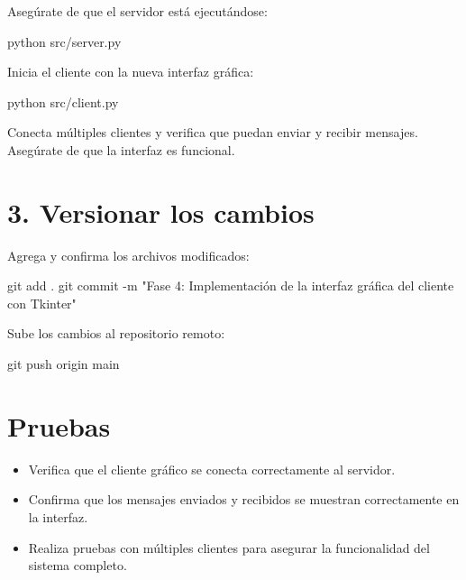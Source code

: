 \documentclass[
  a4paper,
  DIV=11,
  numbers=noendperiod,
  onepage,
  openany]{scrreprt}
\newenvironment{Shaded}{\begin{snugshade}}{\end{snugshade}}
\newcommand{\AttributeTok}[1]{\textcolor[rgb]{0.40,0.45,0.13}{#1}}
\newcommand{\ExtensionTok}[1]{\textcolor[rgb]{0.00,0.23,0.31}{#1}}
\newcommand{\FunctionTok}[1]{\textcolor[rgb]{0.28,0.35,0.67}{#1}}
\newcommand{\NormalTok}[1]{\textcolor[rgb]{0.00,0.23,0.31}{#1}}
\newcommand{\StringTok}[1]{\textcolor[rgb]{0.13,0.47,0.30}{#1}}
\providecommand{\tightlist}{%
  \setlength{\itemsep}{0pt}\setlength{\parskip}{0pt}}\usepackage{longtable,booktabs,array}
\begin{document}
Asegúrate de que el servidor está ejecutándose:

\begin{Shaded}
\begin{Highlighting}[]
\ExtensionTok{python}\NormalTok{ src/server.py}
\end{Highlighting}
\end{Shaded}

Inicia el cliente con la nueva interfaz gráfica:

\begin{Shaded}
\begin{Highlighting}[]
\ExtensionTok{python}\NormalTok{ src/client.py}
\end{Highlighting}
\end{Shaded}

Conecta múltiples clientes y verifica que puedan enviar y recibir
mensajes. Asegúrate de que la interfaz es funcional.

\section{3. Versionar los cambios}\label{versionar-los-cambios-2}

Agrega y confirma los archivos modificados:

\begin{Shaded}
\begin{Highlighting}[]
\FunctionTok{git}\NormalTok{ add .}
\FunctionTok{git}\NormalTok{ commit }\AttributeTok{{-}m} \StringTok{"Fase 4: Implementación de la interfaz gráfica del cliente con Tkinter"}
\end{Highlighting}
\end{Shaded}

Sube los cambios al repositorio remoto:

\begin{Shaded}
\begin{Highlighting}[]
\FunctionTok{git}\NormalTok{ push origin main}
\end{Highlighting}
\end{Shaded}

\section{Pruebas}\label{pruebas-3}

\begin{itemize}
\tightlist
\item
  Verifica que el cliente gráfico se conecta correctamente al servidor.
\item
  Confirma que los mensajes enviados y recibidos se muestran
  correctamente en la interfaz.
\item
  Realiza pruebas con múltiples clientes para asegurar la funcionalidad
  del sistema completo.
\end{itemize}
\end{document}
